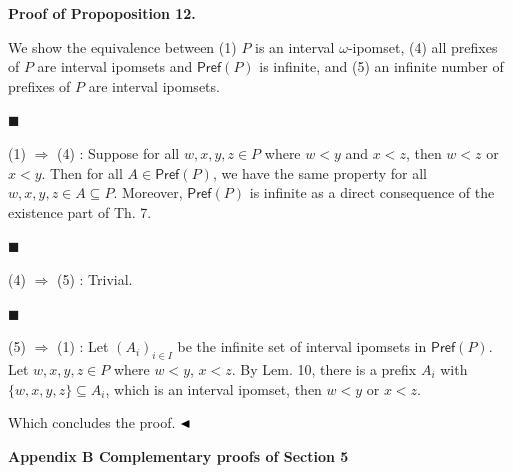\par\medskip\noindent\textbf{Proof of Propoposition 12.}\par
 
 
We show the equivalence between (1) $P$ is an interval $\omega$-ipomset, (4) all prefixes of $P$ are interval ipomsets and $\mathsf{Pref}(P)$ is infinite, and (5) an infinite number of prefixes of $P$ are interval ipomsets.\par
  
\par\noindent  $\blacksquare$ 
 
(1) $\Rightarrow$ (4) : Suppose for all $w,x,y,z\in P$ where $w<y$ and $x<z$, then $w<z$ or $x<y$. Then for all $A\in\mathsf{Pref}(P)$, we have the same property for all $w,x,y,z\in A\subseteq P$. Moreover, $\mathsf{Pref}(P)$ is infinite as a direct consequence of the existence part of Th. 7.\par
 
 
 
\par\noindent  $\blacksquare$ 
 
(4) $\Rightarrow$ (5) : Trivial.\par
 
 
 
\par\noindent  $\blacksquare$ 
 
(5) $\Rightarrow$ (1) : Let $(A_{i})_{i\in I}$ be the infinite set of interval ipomsets in $\mathsf{Pref}(P)$. Let $w,x,y,z\in P$ where $w<y$, $x<z$. By Lem. 10, there is a prefix $A_{i}$ with ${\{w,x,y,z\}}\subseteq A_{i}$, which is an interval ipomset, then $w<y$ or $x<z$.\par
 
 
  
Which concludes the proof. $\hfill\blacktriangleleft$\par
 
 
 


 
\par\medskip\noindent\textbf{Appendix B Complementary proofs of Section 5}\par
 
 

